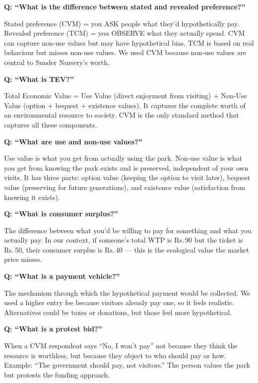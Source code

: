 \documentclass[11pt, a4paper]{article}
\newcommand{\rupee}{Rs.\,}
\newenvironment{ansbox}{%
    \def\FrameCommand{\textcolor{darkgreen}{\vrule width 2pt}\hspace{8pt}}%
    \MakeFramed{\advance\hsize-\width\FrameRestore}%
}{%
    \endMakeFramed%
}
\begin{document}
\textbf{Q: ``What is the difference between stated and revealed preference?''}
\begin{ansbox}
Stated preference (CVM) = you ASK people what they'd hypothetically pay. Revealed preference (TCM) = you OBSERVE what they actually spend. CVM can capture non-use values but may have hypothetical bias. TCM is based on real behaviour but misses non-use values. We used CVM because non-use values are central to Sunder Nursery's worth.
\end{ansbox}

\textbf{Q: ``What is TEV?''}
\begin{ansbox}
Total Economic Value = Use Value (direct enjoyment from visiting) + Non-Use Value (option + bequest + existence values). It captures the complete worth of an environmental resource to society. CVM is the only standard method that captures all these components.
\end{ansbox}

\textbf{Q: ``What are use and non-use values?''}
\begin{ansbox}
Use value is what you get from actually using the park. Non-use value is what you get from knowing the park exists and is preserved, independent of your own visits. It has three parts: option value (keeping the option to visit later), bequest value (preserving for future generations), and existence value (satisfaction from knowing it exists).
\end{ansbox}

\textbf{Q: ``What is consumer surplus?''}
\begin{ansbox}
The difference between what you'd be willing to pay for something and what you actually pay. In our context, if someone's total WTP is \rupee 90 but the ticket is \rupee 50, their consumer surplus is \rupee 40 --- this is the ecological value the market price misses.
\end{ansbox}

\textbf{Q: ``What is a payment vehicle?''}
\begin{ansbox}
The mechanism through which the hypothetical payment would be collected. We used a higher entry fee because visitors already pay one, so it feels realistic. Alternatives could be taxes or donations, but those feel more hypothetical.
\end{ansbox}

\textbf{Q: ``What is a protest bid?''}
\begin{ansbox}
When a CVM respondent says ``No, I won't pay'' not because they think the resource is worthless, but because they object to who should pay or how. Example: ``The government should pay, not visitors.'' The person values the park but protests the funding approach.
\end{ansbox}
\end{document}
